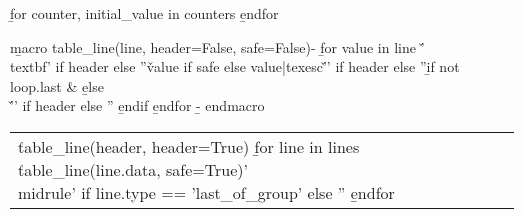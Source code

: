 \b{for counter, initial_value in counters}
\b{endfor}

\b{macro table_line(line, header=False, safe=False)-}
\b{for value in line}
\v{'\\textbf{' if header else ''}\v{value if safe else value|texesc}\v{'}' if header else ''}\b{if not loop.last} & \b{else} \\\v{'\midrule\endhead' if header else ''}
\b{endif}
\b{endfor}
\b{- endmacro}

\small

\renewcommand\arraystretch{1.2}

\begin{spacing}{.9}
\setlength\LTleft{-.5in}
\setlength\LTright{-.5in}
\begin{tabularx}{1.15\linewidth}{@{}p{1.5cm} | p{1.1cm} | p{1.1cm} | p{6cm} X@{}}
\toprule
\v{table_line(header, header=True)}
\b{for line in lines}
\v{table_line(line.data, safe=True)}\v{'\\midrule' if line.type == 'last_of_group' else ''}
\b{endfor}\bottomrule
\end{tabularx}
\end{spacing}
